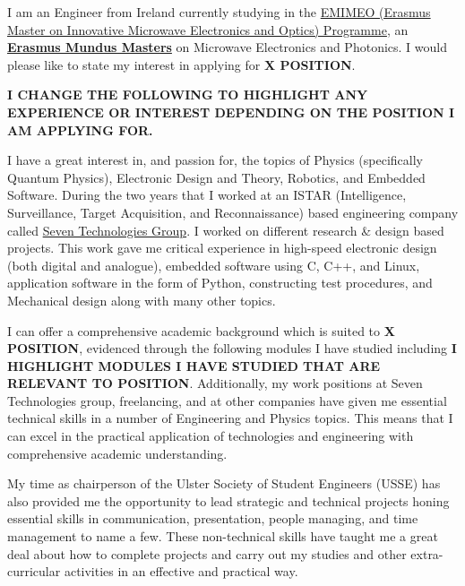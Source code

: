 \documentclass[11pt,a4paper,withhyper]{altacv}
\begin{document}
I am an Engineer from Ireland currently studying in the \href{http://www.erasmus-master.emimeo.eu/}{EMIMEO (Erasmus Master on Innovative Microwave Electronics and Optics) Programme}, an \textbf{\href{https://www.eacea.ec.europa.eu/scholarships/erasmus-mundus-catalogue_en}{Erasmus Mundus Masters}} on Microwave Electronics and Photonics.
I would please like to state my interest in applying for \textbf{\color{accent}\MakeUppercase{X position}}. \linebreak



\textbf{\color{accent}\MakeUppercase{I change the following to highlight any experience or interest depending on the position I am applying for.}}

I have a great interest in, and passion for, the topics of Physics (specifically Quantum Physics), Electronic Design and Theory, Robotics, and Embedded Software. \linebreak 
During the two years that I worked at an ISTAR (Intelligence, Surveillance, Target Acquisition, and Reconnaissance) based engineering company called \href{https://www.7techgroup.com/}{Seven Technologies Group}. I worked on different research \& design based projects. This work gave me critical experience in high-speed electronic design (both digital and analogue), embedded software using C, C++, and Linux, application software in the form of Python, constructing test procedures, and Mechanical design along with many other topics. \linebreak



I can offer a comprehensive academic background which is suited to \textbf{\color{accent}\MakeUppercase{X position}}, evidenced through the following modules I have studied including \textbf{\color{accent}\MakeUppercase{I highlight modules I have studied that are relevant to position}}.
Additionally, my work positions at Seven Technologies group, freelancing, and at other companies have given me essential technical skills in a number of Engineering and Physics topics. This means that I can excel in the practical application of technologies and engineering with comprehensive academic understanding. \linebreak

My time as chairperson of the Ulster Society of Student Engineers (USSE) has also provided me the opportunity to lead strategic and technical projects honing essential skills in communication, presentation, people managing, and time management to name a few. These non-technical skills have taught me a great deal about how to complete projects and carry out my studies and other extra-curricular activities in an effective and practical way. \linebreak
\end{document}
